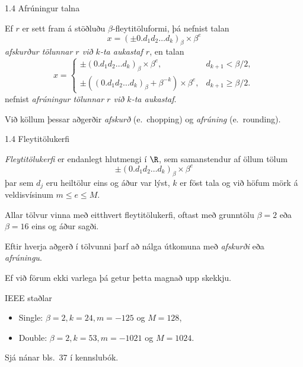 %
%
\begin{frame}{1.4 Afrúningur talna} 

Ef $r$ er sett fram á stöðluðu $\beta$-fleytitöluformi, þá nefnist talan
\begin{equation*}
    x = (\pm 0.d_1d_2\dots d_k)_\beta\times \beta^e
\end{equation*}
{\it afskurður tölunnar $r$ við $k$-ta aukastaf $r$},  \pause en talan
\begin{equation*}
    x = \begin{cases} 
    \pm (0.d_1d_2\dots d_k)_\beta\times \beta^e, & 
    d_{k+1}<\beta/2,\\
    \pm ((0.d_1d_2\dots d_k)_\beta+\beta^{-k})\times \beta^e,
    &d_{k+1}\geq \beta/2.
    \end{cases}
\end{equation*}
nefnist {\it afrúningur tölunnar $r$ við $k$-ta aukastaf}.

\pause
Við  köllum þessar aðgerðir {\it afskurð} (e.~chopping) og {\it afrúning}
(e.~rounding).  
\end{frame}
%
%
\begin{frame}{1.4 Fleytitölukerfi}
 
{\it Fleytitölukerfi} er endanlegt hlutmengi í $\R$, sem samanstendur
af öllum tölum  
\begin{equation*}
    \pm (0.d_1d_2\dots d_k)_\beta\times \beta^e
\end{equation*}
þar sem $d_j$ eru heiltölur eins og áður var lýst, $k$ er föst tala
og við höfum mörk á veldisvísinum $m\leq e\leq M$. \pause


Allar tölvur vinna með eitthvert fleytitölukerfi, oftast
með grunntölu $\beta=2$ eða $\beta=16$ eins og áður sagði.

\pause
Eftir hverja aðgerð í tölvunni þarf að nálga útkomuna með 
{\it afskurði} eða {\it afrúningu}. 

\pause
Ef við förum ekki varlega þá getur þetta magnað upp skekkju.

\pause
\begin{block}{IEEE staðlar}
\begin{itemize}
 \item Single: $\beta = 2, k=24, m=-125$ og $M = 128$,
 \item Double: $\beta = 2, k=53, m=-1021$ og $M=1024$.
\end{itemize}
Sjá nánar bls.~37 í kennslubók.
\end{block}\end{frame}

